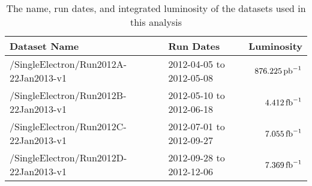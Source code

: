 \begin{table}[h]
    \centering
    \begin{center}
        \begin{tabular}{@{}l l r@{}}
            \toprule
            Dataset Name                          & Run Dates                & Luminosity       \\
            \midrule
            /SingleElectron/Run2012A-22Jan2013-v1 & 2012-04-05 to 2012-05-08 & $876.225 \mbox{\ensuremath{\,\text{pb}^\text{$-$1}}}$ \\
            /SingleElectron/Run2012B-22Jan2013-v1 & 2012-05-10 to 2012-06-18 & $4.412 \mbox{\ensuremath{\,\text{fb}^\text{$-$1}}}$   \\
            /SingleElectron/Run2012C-22Jan2013-v1 & 2012-07-01 to 2012-09-27 & $7.055 \mbox{\ensuremath{\,\text{fb}^\text{$-$1}}}$   \\
            /SingleElectron/Run2012D-22Jan2013-v1 & 2012-09-28 to 2012-12-06 & $7.369 \mbox{\ensuremath{\,\text{fb}^\text{$-$1}}}$   \\
            \bottomrule
        \end{tabular}
    \end{center}
    \caption[
        Summary of datasets.
    ]{
        The name, run dates, and integrated luminosity of the datasets used in this
        analysis
    }
    \label{table:datasets}
\end{table}
